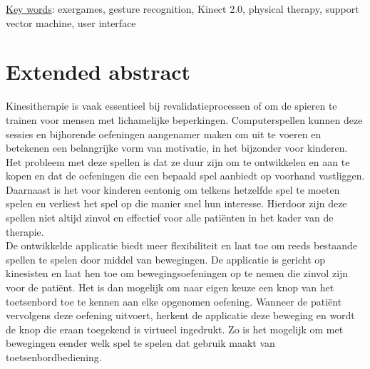 


\underline{Key words}: exergames, gesture recognition, Kinect 2.0, physical therapy, support vector machine, user interface


\chapter*{Extended abstract}

Kinesitherapie is vaak essentieel bij revalidatieprocessen of om de spieren te trainen voor mensen met lichamelijke beperkingen. Computerspellen kunnen deze sessies en bijhorende oefeningen aangenamer maken om uit te voeren en betekenen een belangrijke vorm van motivatie, in het bijzonder voor kinderen. Het probleem met deze spellen is dat ze duur zijn om te ontwikkelen en aan te kopen en dat de oefeningen die een bepaald spel aanbiedt op voorhand vastliggen. Daarnaast is het voor kinderen eentonig om telkens hetzelfde spel te moeten spelen en verliest het spel op die manier snel hun interesse. Hierdoor zijn deze spellen niet altijd zinvol en effectief voor alle pati\"enten in het kader van de therapie.\\

De ontwikkelde applicatie biedt meer flexibiliteit en laat toe om reeds bestaande spellen te spelen door middel van bewegingen. De applicatie is gericht op kinesisten en laat hen toe om bewegingsoefeningen op te nemen die zinvol zijn voor de pati\"ent. Het is dan mogelijk om naar eigen keuze een knop van het toetsenbord toe te kennen aan elke opgenomen oefening. Wanneer de pati\"ent vervolgens deze oefening uitvoert, herkent de applicatie deze beweging en wordt de knop die eraan toegekend is virtueel ingedrukt. Zo is het mogelijk om met bewegingen eender welk spel te spelen dat gebruik maakt van toetsenbordbediening.\\

